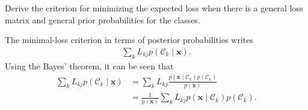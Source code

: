 \begin{question}{1.23}
	Derive the criterion for minimizing the expected loss when there is a general loss matrix and general prior probabilities for the classes.
\end{question}

\begin{answer}{}
	The minimal-loss criterion in terms of posterior probabilities writes
	\begin{align}
		\sum_{k} L_{kj}p(\mathcal{C}_k \mid \bm{x}).
	\end{align}
	Using the Bayes' theorem, it can be seen that
	\begin{align}
		\sum_{k} L_{kj}p(\mathcal{C}_k \mid \bm{x}) &= \sum_{k} L_{kj}\frac{p(\bm{x} \mid \mathcal{C}_k ) p(\mathcal{C}_k)}{p(\bm{x})}\\
		&= \frac{1}{p(\bm{x})} \sum_{k} L_{kj} p(\bm{x} \mid \mathcal{C}_k ) p(\mathcal{C}_k).
	\end{align}
\end{answer}